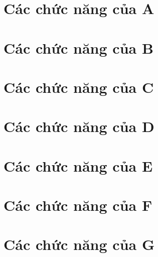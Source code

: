 \section{Các chức năng của A}
\section{Các chức năng của B}
\section{Các chức năng của C}
\section{Các chức năng của D}
\section{Các chức năng của E}
\section{Các chức năng của F}
\section{Các chức năng của G}
